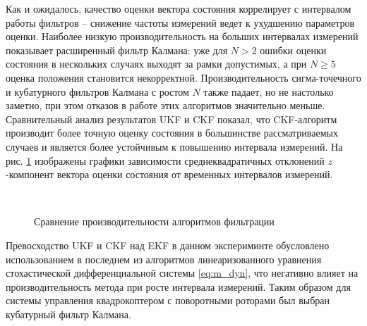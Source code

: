 Как и ожидалось, качество оценки вектора состояния коррелирует с интервалом работы фильтров --
снижение частоты измерений  ведет к ухудшению параметров оценки.
Наиболее низкую производительность на больших интервалах измерений показывает расширенный фильтр Калмана:
уже для $N>2$ ошибки оценки состояния в нескольких случаях выходят за рамки допустимых,
а при $N \geq 5$ оценка положения становится некорректной.
Производительность сигма-точечного и кубатурного фильтров Калмана с ростом $N$ также падает,
но не настолько заметно, при этом отказов в работе этих алгоритмов значительно меньше.
Сравнительный анализ результатов UKF и CKF показал, что CKF-алгоритм производит более точную оценку состояния
в большинстве рассматриваемых случаев и является более устойчивым к повышению интервала измерений.
На рис. \ref{fig:est_cmpr} изображены графики зависимости среднеквадратичных отклонений
$z$-компонент вектора оценки состояния от временных интервалов измерений.
\begin{figure}[h]
	\begin{minipage}[h]{0.49\linewidth}
	\end{minipage}
	\hfill
	\begin{minipage}[h]{0.49\linewidth}
	\end{minipage}
	\\
	\begin{minipage}[h]{0.49\linewidth}
	\end{minipage}
	\hfill
	\begin{minipage}[h]{0.49\linewidth}
	\end{minipage}
	\caption{Сравнение производительности алгоритмов фильтрации}
    \label{fig:est_cmpr}
\end{figure}

Превосходство UKF и CKF над EKF в данном экспериминте
обусловлено использованием в последнем из алгоритмов
линеаризованного уравнения стохастической дифференциальной системы \eqref{eq:m_dyn},
что негативно влияет на производительность метода при росте интервала измерений. Таким образом для системы управления квадрокоптером с поворотными роторами был выбран кубатурный фильтр Калмана.

